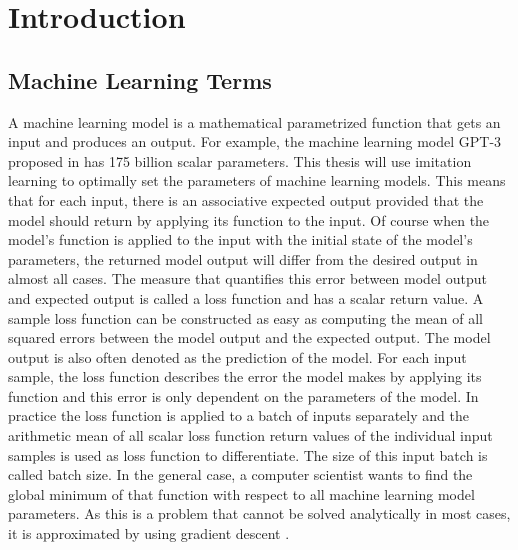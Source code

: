 \documentclass[draft,final]{vutinfth} %
\begin{document}

    \tableofcontents %

    \mainmatter

    \chapter{Introduction}

    \section{Machine Learning Terms}
    A machine learning model is a mathematical parametrized function that gets an input and produces an output.
    For example, the machine learning model GPT-3 proposed in \cite{GPT-3} has 175 billion scalar parameters.
    This thesis will use imitation learning to optimally set the parameters of machine learning models.
    This means that for each input, there is an associative expected output provided that the model should return by applying its function to the input.
    Of course when the model's function is applied to the input with the initial state of the model's parameters, the returned model output will differ from the desired output in almost all cases.
    The measure that quantifies this error between model output and expected output is called a loss function and has a scalar return value.
    A sample loss function can be constructed as easy as computing the mean of all squared errors between the model output and the expected output.
    The model output is also often denoted as the prediction of the model.
    For each input sample, the loss function describes the error the model makes by applying its function and this error is only dependent on the parameters of the model.
    In practice the loss function is applied to a batch of inputs separately and the arithmetic mean of all scalar loss function return values of the individual input samples is used as loss function to differentiate.
    The size of this input batch is called batch size.
    In the general case, a computer scientist wants to find the global minimum of that function with respect to all machine learning model parameters.
    As this is a problem that cannot be solved analytically in most cases, it is approximated by using gradient descent \cite{GradientDescent}.
\end{document}
